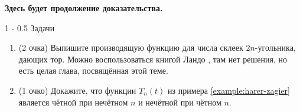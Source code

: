 \documentclass[a5paper]{article}
\makeatletter
\theoremstyle{definition}
\renewcommand{\section}{\@startsection
{section}%
{1}%
{\z@}%
{-\baselineskip}%
{0.5\baselineskip}%
{\centering\large\scshape}} %
\makeatother
\begin{document}
\textbf{Здесь будет продолжение доказательства.}

\section{Задачи}

\begin{enumerate}
    \item(2 очка) Выпишите производящую функцию для числа склеек \( 2n \)-угольника,
дающих тор. Можно воспользоваться книгой Ландо \cite{lando}, там нет решения, но
есть целая глава, посвящённая этой теме.
    \item(1 очко) Докажите, что функции \( T_n(t) \) из примера
\ref{example:harer-zagier}
является чётной при нечётном \( n \) и нечётной при чётном \( n \).
\end{enumerate}

\footnotesize


    
\end{document}
